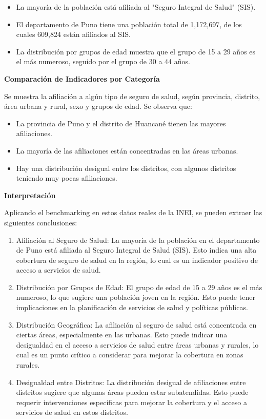 	\begin{itemize}
		\item La mayoría de la población está afiliada al "Seguro Integral de Salud" (SIS).
		\item El departamento de Puno tiene una población total de 1,172,697, de los cuales 609,824 están afiliados al SIS.
		\item La distribución por grupos de edad muestra que el grupo de 15 a 29 años es el más numeroso, seguido por el grupo de 30 a 44 años.
	\end{itemize}
	
	\textbf{Comparación de Indicadores por Categoría}
	
	Se muestra la afiliación a algún tipo de seguro de salud, según provincia, distrito, área urbana y rural, sexo y grupos de edad. Se observa que:
	
	\begin{itemize}
		\item La provincia de Puno y el distrito de Huancané tienen las mayores afiliaciones.
		\item La mayoría de las afiliaciones están concentradas en las áreas urbanas.
		\item Hay una distribución desigual entre los distritos, con algunos distritos teniendo muy pocas afiliaciones.
	\end{itemize}
	
	\textbf{Interpretación}
	
	Aplicando el benchmarking en estos datos reales de la INEI, se pueden extraer las siguientes conclusiones:
	
	\begin{enumerate}
		\item Afiliación al Seguro de Salud: La mayoría de la población en el departamento de Puno está afiliada al Seguro Integral de Salud (SIS). Esto indica una alta cobertura de seguro de salud en la región, lo cual es un indicador positivo de acceso a servicios de salud.
		\item Distribución por Grupos de Edad: El grupo de edad de 15 a 29 años es el más numeroso, lo que sugiere una población joven en la región. Esto puede tener implicaciones en la planificación de servicios de salud y políticas públicas.
		\item Distribución Geográfica: La afiliación al seguro de salud está concentrada en ciertas áreas, especialmente en las urbanas. Esto puede indicar una desigualdad en el acceso a servicios de salud entre áreas urbanas y rurales, lo cual es un punto crítico a considerar para mejorar la cobertura en zonas rurales.
		\item Desigualdad entre Distritos: La distribución desigual de afiliaciones entre distritos sugiere que algunas áreas pueden estar subatendidas. Esto puede requerir intervenciones específicas para mejorar la cobertura y el acceso a servicios de salud en estos distritos.
	\end{enumerate}
	
